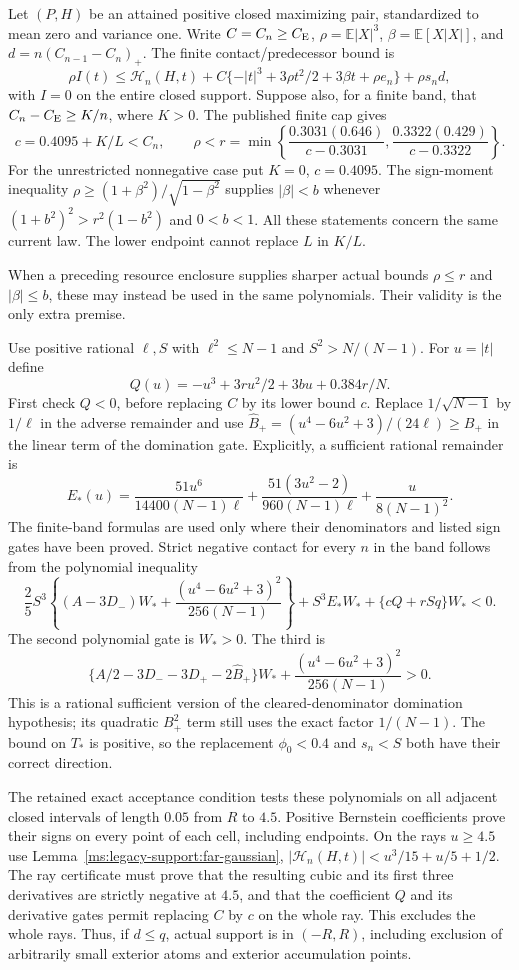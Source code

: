 Let $(P,H)$ be an attained positive closed maximizing pair, standardized
to mean zero and variance one. Write $C=C_n\ge C_{\mathrm E}$,
$\rho=\mathbb E|X|^3$, $\beta=\mathbb E[X|X|]$, and
$d=n(C_{n-1}-C_n)_+$. The finite contact/predecessor bound is
\[
 \rho I(t)\le\mathcal H_n(H,t)+
 C\{-|t|^3+3\rho t^2/2+3\beta t+\rho e_n\}+\rho s_nd,
\]
with $I=0$ on the entire closed support. Suppose also, for a finite
band, that $C_n-C_{\mathrm E}\ge K/n$, where $K>0$. The published finite cap gives
\[
 c=0.4095+K/L<C_n,\qquad
 \rho<r=\min\left\{\frac{0.3031(0.646)}{c-0.3031},
                        \frac{0.3322(0.429)}{c-0.3322}\right\}.
\]
For the unrestricted nonnegative case put $K=0$, $c=0.4095$.
The sign-moment inequality
$\rho\ge(1+\beta^2)/\sqrt{1-\beta^2}$ supplies $|\beta|<b$ whenever
$(1+b^2)^2>r^2(1-b^2)$ and $0<b<1$. All these statements concern the
same current law. The lower endpoint cannot replace $L$ in $K/L$.

When a preceding resource enclosure supplies sharper actual bounds
$\rho\le r$ and $|\beta|\le b$, these may instead be used in the
same polynomials. Their validity is the only extra premise.

Use positive rational $\ell,S$ with $\ell^2\le N-1$ and $S^2>N/(N-1)$. For $u=|t|$ define
\[
 Q(u)=-u^3+3ru^2/2+3bu+0.384r/N.
\]
First check $Q<0$, before replacing $C$ by its lower bound $c$.
Replace $1/\sqrt{N-1}$ by $1/\ell$ in the adverse remainder and use
$\widehat B_+=(u^4-6u^2+3)/(24\ell)\ge B_+$ in the linear term of
the domination gate. Explicitly, a sufficient rational remainder is
\[
 E_*(u)=\frac{51u^6}{14400(N-1)\ell}
       +\frac{51(3u^2-2)}{960(N-1)\ell}
       +\frac{u}{8(N-1)^2}.
\]
The finite-band formulas are used only where their denominators and
listed sign gates have been proved. Strict negative contact for every $n$ in the band follows
from the polynomial inequality
\[
 \frac25S^3\left\{(A-3D_-)W_*+
              \frac{(u^4-6u^2+3)^2}{256(N-1)}\right\}
 +S^3E_*W_*+\{cQ+rSq\}W_*<0.
\]
The second polynomial gate is $W_*>0$. The third is
\[
 \{A/2-3D_--3D_+-2\widehat B_+\}W_*+
         \frac{(u^4-6u^2+3)^2}{256(N-1)}>0.
\]
This is a rational sufficient version of the cleared-denominator
domination hypothesis; its quadratic $B_+^2$ term still uses the exact
factor $1/(N-1)$.
The bound on $T_*$ is positive, so the replacement $\phi_0<0.4$ and
$s_n<S$ both have their correct direction.

The retained exact acceptance condition tests these polynomials on all adjacent closed intervals
of length $0.05$ from $R$ to $4.5$. Positive Bernstein coefficients prove
their signs on every point of each cell, including endpoints. On the
rays $u\ge4.5$ use Lemma~\ref{ms:legacy-support:far-gaussian},
$|\mathcal H_n(H,t)|< u^3/15+u/5+1/2$.
The ray certificate must prove that the resulting cubic and its first three
derivatives are strictly negative at $4.5$, and that the coefficient $Q$
and its derivative gates permit replacing $C$ by $c$ on the whole ray.
This excludes the whole rays. Thus, if $d\le q$, actual support is in
$(-R,R)$, including exclusion of arbitrarily small exterior atoms and
exterior accumulation points.

